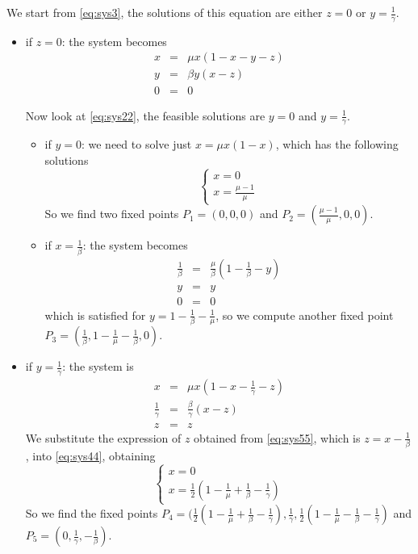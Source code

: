 \documentclass[10pt]{Configuration_Files/PoliMi3i_thesis}
\begin{document}
We start from \autoref{eq:sys3}, the solutions of this equation are either $z=0$ or $y=\frac{1}{\gamma}$.
\begin{itemize}
  \item if $z=0$: the system becomes 
  \begin{eqnarray}
    x & = & \mu x (1-x-y-z) \label{eq:sys11}\\
    y & = & \beta y (x-z) \label{eq:sys22} \\
    0 & = & 0 \label{eq:sys33}
    \end{eqnarray}

  Now look at \autoref{eq:sys22}, the feasible solutions are $y=0$ and $y=\frac{1}{\gamma}$.
  \begin{itemize}
     \item if $y=0$: we need to solve just $ x  = \mu x (1-x) $, which has the following solutions 
     \begin{equation*}
        \begin{cases}
      x=0 \\ 
      x = \frac{\mu-1}{\mu}
        \end{cases}
     \end{equation*}
     So we find two fixed points $P_1 = (0,0,0)$ and $P_2 = (\frac{\mu-1}{\mu}, 0, 0)$.
     \item if $x= \frac{1}{\beta}$: the system becomes 
     \begin{eqnarray}
    \frac{1}{\beta} & = & \frac{\mu}{\beta} (1-\frac{1}{\beta}-y) \\
    y & = & y \\
    0 & = & 0
    \end{eqnarray}
    which is satisfied for $y=1-\frac{1}{\beta}-\frac{1}{\mu}$, so we compute another fixed point $P_3 = (\frac{1}{\beta}, 1-\frac{1}{\mu}-\frac{1}{\beta}, 0)$.
    \end{itemize}
  
    \item if $y=\frac{1}{\gamma}$: the system is 
    \begin{eqnarray}
    x & = &  \mu x (1-x-\frac{1}{\gamma}-z) \label{eq:sys44}\\
    \frac{1}{\gamma} & = & \frac{\beta}{\gamma} (x-z) \label{eq:sys55}\\
    z & = & z
    \end{eqnarray}
    We substitute the expression of $z$ obtained from \ref{eq:sys55}, which is $z = x - \frac{1}{\beta}$, into \ref{eq:sys44}, obtaining 
    \begin{equation*}
        \begin{cases}
      x=0 \\ 
      x = \frac{1}{2} ( 1-\frac{1}{\mu}+\frac{1}{\beta}-\frac{1}{\gamma})
        \end{cases}
     \end{equation*}
     So we find  the fixed points $P_4 = (\frac{1}{2}(1-\frac{1}{\mu}+\frac{1}{\beta}-\frac{1}{\gamma}), \frac{1}{\gamma}, \frac{1}{2}(1-\frac{1}{\mu}-\frac{1}{\beta}-\frac{1}{\gamma})$ and   $P_5 = (0, \frac{1}{\gamma}, -\frac{1}{\beta})$.

\end{itemize}
\end{document}
